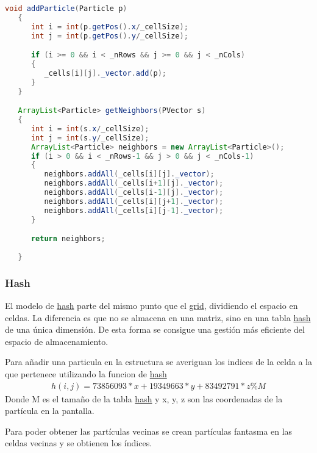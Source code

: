 \documentclass{article}
\begin{document}
\begin{lstlisting}[language=Java, frame=single]
    void addParticle(Particle p)
   {
      int i = int(p.getPos().x/_cellSize);
      int j = int(p.getPos().y/_cellSize);

      if (i >= 0 && i < _nRows && j >= 0 && j < _nCols)
      {
         _cells[i][j]._vector.add(p);
      }
   }

   ArrayList<Particle> getNeighbors(PVector s)
   {
      int i = int(s.x/_cellSize);
      int j = int(s.y/_cellSize);
      ArrayList<Particle> neighbors = new ArrayList<Particle>();
      if (i > 0 && i < _nRows-1 && j > 0 && j < _nCols-1)
      {
         neighbors.addAll(_cells[i][j]._vector);
         neighbors.addAll(_cells[i+1][j]._vector);
         neighbors.addAll(_cells[i-1][j]._vector);
         neighbors.addAll(_cells[i][j+1]._vector);
         neighbors.addAll(_cells[i][j-1]._vector);
      }

      return neighbors;
      
   }
\end{lstlisting}


\subsubsection{Hash}\label{sec:hash}

El modelo de \hyperref[sec:hash]{hash} parte del mismo punto que el \hyperref[sec:grid]{grid}, dividiendo el espacio en celdas. La diferencia es que no se almacena en una matriz, sino en una tabla \hyperref[sec:hash]{hash} de una única dimensión. De esta forma se consigue una gestión más eficiente del espacio de almacenamiento.

Para añadir una particula en la estructura se averiguan los indices de la celda a la que pertenece utilizando la funcion de \hyperref[sec:hash]{hash}
\begin{align*}
    h(i,j) = 73856093*x + 19349663*y + 83492791*z \% M
\end{align*}
\noindent
Donde M es el tamaño de la tabla \hyperref[sec:hash]{hash} y x, y, z son las coordenadas de la partícula	en la pantalla.

Para poder obtener las partículas vecinas se crean partículas fantasma en las celdas vecinas y se obtienen los índices.
\end{document}
